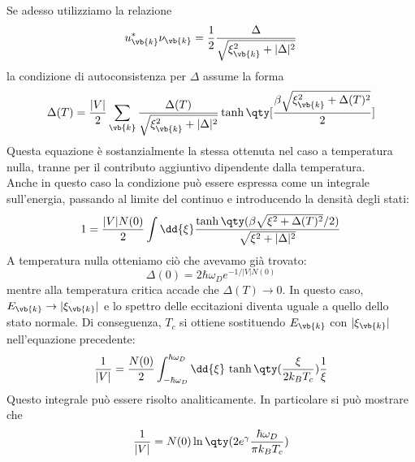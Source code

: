 Se adesso utilizziamo la relazione
\begin{equation*}
   u^*_{\vb{k}}
   \nu_{\vb{k}}
   =
   \frac{1}{2}
   \frac{
      \Delta
   }{
      \sqrt{
         \xi^2_{\vb{k}}
         +
         |\Delta|^2
      }
   }
\end{equation*}
la condizione di autoconsistenza per $\Delta$ assume la forma
\begin{equation*}
   \Delta(T)
   =
   \frac{|V|}{2}
   \sum_{\vb{k}}
   \frac{
      \Delta(T)
   }{
      \sqrt{
         \xi^2_{\vb{k}}
         +
         |\Delta|^2
      }
   }
   \tanh \qty[
      \frac{
         \beta
         \sqrt{
            \xi^2_{\vb{k}}
            +
            \Delta(T)^2
         }
      }{2}
   ]
\end{equation*}
Questa equazione è sostanzialmente la stessa ottenuta nel caso a temperatura nulla, tranne per il contributo aggiuntivo dipendente dalla temperatura.\\
Anche in questo caso la condizione può essere espressa come un integrale sull'energia, passando al limite del continuo e introducendo la densità degli stati:
\begin{equation*}
   1
   =
   \frac{|V|N(0)}{2}
   \int
   \dd{\xi}
   \frac{
      \tanh \qty(
         \beta
         \sqrt{
            \xi^2+\Delta(T)^2
         }/2
      )
   }{
      \sqrt{
         \xi^2+|\Delta|^2
      }
   }
\end{equation*}
A temperatura nulla otteniamo ciò che avevamo già trovato:
\begin{equation*}
   \Delta(0)
   =
   2\hbar\omega_D
   e^{-1/|V|N(0)}
\end{equation*}
mentre alla temperatura critica accade che $\Delta(T)\to0$. In questo caso, $E_{\vb{k}} \to |\xi_{\vb{k}}|$ e lo spettro delle eccitazioni diventa uguale a quello dello stato normale. Di conseguenza, $T_c$ si ottiene sostituendo $E_{\vb{k}}$ con $|\xi_{\vb{k}}|$ nell'equazione precedente:
\begin{equation}
   \frac{1}{|V|}
   =
   \frac{N(0)}{2}
   \int_{-\hbar\omega_D}^{\hbar\omega_D}
   \dd{\xi}
   \,
   \tanh\qty(
      \frac{\xi}{2k_B T_c}
   )
   \frac{1}{\xi}
   \label{eq:critical_temperature_integral}
\end{equation}
Questo integrale può essere risolto analiticamente. In particolare si può mostrare che
\begin{equation*}
   \frac{1}{|V|}
   =
   N(0)
   \ln\qty(
      2e^{\gamma}
      \frac{
         \hbar\omega_D
      }{
         \pi k_B T_c
      }
   )
\end{equation*}

